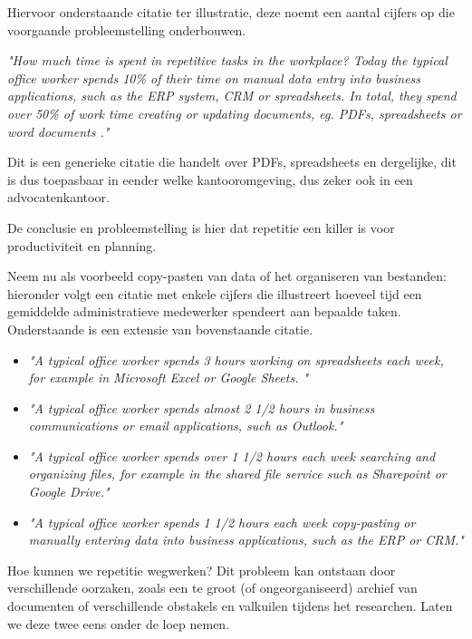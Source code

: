 Hiervoor onderstaande citatie ter illustratie, deze noemt een aantal cijfers op die voorgaande probleemstelling onderbouwen.
\begin{displayquote}
	\textit{"How much time is spent in repetitive tasks in the workplace? Today the typical office worker spends 10\% of their time on manual data entry into business applications,
		such as the ERP system, CRM or spreadsheets. In total, they spend over 50\% of work time creating or updating documents, eg. PDFs, spreadsheets or word documents \autocite{Workfellow}."}
\end{displayquote}

Dit is een generieke citatie die handelt over PDFs, spreadsheets en dergelijke, dit is dus toepasbaar in eender welke kantooromgeving, dus zeker ook in een advocatenkantoor.

De conclusie en probleemstelling is hier dat repetitie een killer is voor productiviteit en planning.

Neem nu als voorbeeld copy-pasten van data of het organiseren van bestanden: hieronder volgt een citatie met enkele cijfers die illustreert hoeveel tijd een gemiddelde administratieve medewerker
spendeert aan bepaalde taken. Onderstaande is een extensie van bovenstaande citatie.

\begin{displayquote}
	\begin{itemize}
		\item \emph {"A typical office worker spends 3 hours working on spreadsheets each week, for example in Microsoft Excel or Google Sheets. "}\autocite{Workfellow}
		\item \emph {"A typical office worker spends almost 2 1/2 hours in business communications or email applications, such as Outlook."}\autocite{Workfellow}
		\item \emph {"A typical office worker spends over 1 1/2 hours each week searching and organizing files, for example in the shared file service such as Sharepoint or Google Drive."}\autocite{Workfellow}
		\item \emph {"A typical office worker spends 1 1/2 hours each week copy-pasting or manually entering data into business applications, such as the ERP or CRM."} \autocite{Workfellow}
	\end{itemize}
\end{displayquote}

Hoe kunnen we repetitie wegwerken? Dit probleem kan ontstaan door verschillende oorzaken, zoals een te groot (of ongeorganiseerd) archief van documenten of verschillende obstakels en valkuilen
tijdens het researchen. Laten we deze twee eens onder de loep nemen.
\newpage


